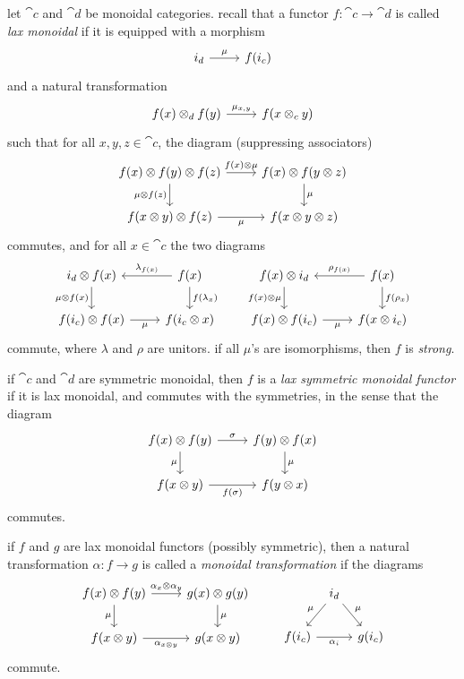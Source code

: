 \documentclass[11pt,oneside,article]{memoir}
\begin{document}
let $\cat{c}$ and $\cat{d}$ be monoidal categories. recall that a functor
$f\colon\cat{c}\to\cat{d}$ is called \emph{lax monoidal} if it is equipped with a morphism
\[
\begin{tikzcd}
   i_d \rar{\mu} & f(i_c)
\end{tikzcd}
\]
and a natural transformation
\[
\begin{tikzcd}
   f(x) \otimes_d f(y) \rar{\mu_{x,y}} & f(x\otimes_c y)
\end{tikzcd}
\]
such that for all $x,y,z\in\cat{c}$, the diagram (suppressing associators)
\[
\begin{tikzcd}
   f(x)\otimes f(y) \otimes f(z)
      \rar{f(x)\otimes\mu}
      \dar[swap]{\mu\otimes f(z)}
   & f(x)\otimes f(y\otimes z)
      \dar{\mu} \\
   f(x\otimes y)\otimes f(z)
      \rar[swap]{\mu}
   & f(x\otimes y\otimes z)
\end{tikzcd}
\]
commutes, and for all $x\in\cat{c}$ the two diagrams
\[
\begin{tikzcd}
   i_d\otimes f(x)
      \dar[swap]{\mu\otimes f(x)}
   & f(x)
      \lar[swap]{\lambda_{f(x)}}
      \dar{f(\lambda_x)} \\
   f(i_c)\otimes f(x)
      \rar[swap]{\mu}
   & f(i_c\otimes x)
\end{tikzcd}
\qquad
\begin{tikzcd}
   f(x) \otimes i_d
      \dar[swap]{f(x)\otimes\mu}
   & f(x)
      \lar[swap]{\rho_{f(x)}}
      \dar{f(\rho_x)} \\
   f(x)\otimes f(i_c)
      \rar[swap]{\mu}
   & f(x\otimes i_c)
\end{tikzcd}
\]
commute, where $\lambda$ and $\rho$ are unitors.
if all $\mu$'s are isomorphisms, then $f$ is \emph{strong}.

if $\cat{c}$ and $\cat{d}$ are symmetric monoidal, then $f$ is a \emph{lax symmetric monoidal
functor} if it is lax monoidal, and commutes with the symmetries, in the sense that the diagram
\[
\begin{tikzcd}
   f(x)\otimes f(y)
      \rar{\sigma}
      \dar[swap]{\mu}
   & f(y)\otimes f(x)
      \dar{\mu} \\
   f(x\otimes y)
      \rar[swap]{f(\sigma)}
   & f(y\otimes x)
\end{tikzcd}
\]
commutes.

if $f$ and $g$ are lax monoidal functors (possibly symmetric), then a natural transformation
$\alpha\colon f\to g$ is called a \emph{monoidal transformation} if the diagrams
\[
\begin{tikzcd}
   f(x)\otimes f(y)
      \rar{\alpha_x\otimes\alpha_y}
      \dar[swap]{\mu}
   & g(x)\otimes g(y)
      \dar{\mu} \\
   f(x\otimes y)
      \rar[swap]{\alpha_{x\otimes y}}
   & g(x\otimes y)
\end{tikzcd}
\qquad
\begin{tikzcd}[column sep=tiny]
   {} & i_d \dlar[swap]{\mu} \drar{\mu} & \\
   f(i_c) \ar{rr}[swap]{\alpha_i} && g(i_c)
\end{tikzcd}
\]
commute.
\end{document}

